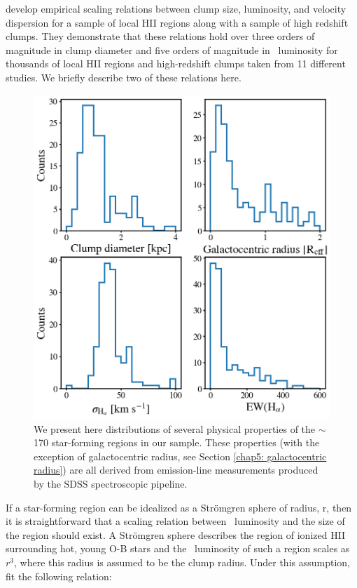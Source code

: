 \cite{Wisnioski2012} develop empirical scaling relations between clump size, luminosity, and velocity dispersion for a sample of local HII regions along with a sample of high redshift clumps. They demonstrate that these relations hold over three orders of magnitude in clump diameter and five orders of magnitude in \ha~luminosity for thousands of local HII regions and high-redshift clumps taken from 11 different studies. We briefly describe two of these relations here. 


\begin{figure}
\centering
\includegraphics[width=5in]{Figures/clump_4properties.png}
\caption[Histogram distributions of several physical properties for $\sim$170 ``clumps.'']{We present here distributions of several physical properties of the $\sim$170 star-forming regions in our sample. These properties (with the exception of galactocentric radius, see Section \ref{chap5: galactocentric radius}) are all derived from emission-line measurements produced by the SDSS spectroscopic pipeline. }
\label{fig: clump histograms}
\end{figure}

If a star-forming region can be idealized as a Str{\"o}mgren sphere of radius, r, then it is straightforward that a scaling relation between \ha~luminosity and the size of the region should exist. A Str{\"o}mgren sphere describes the region of ionized HII surrounding hot, young O-B stars and the \ha~luminosity of such a region scales as $r^3$, where this radius is assumed to be the clump radius. Under this assumption, \citep{Wisnioski2012} fit the following relation:

